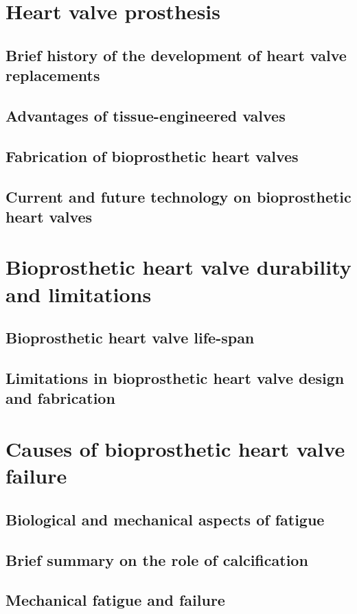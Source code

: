 \section{Heart valve prosthesis}

\subsection{Brief history of the development of heart valve replacements}

\subsection{Advantages of tissue-engineered valves}

\subsection{Fabrication of bioprosthetic heart valves}

\subsection{Current and future technology on bioprosthetic heart valves}




\section{Bioprosthetic heart valve durability and limitations}

\subsection{Bioprosthetic heart valve life-span}

\subsection{Limitations in bioprosthetic heart valve design and fabrication}


\section{Causes of bioprosthetic heart valve failure}

\subsection{Biological and mechanical aspects of fatigue}

\subsection{Brief summary on the role of calcification}

\subsection{Mechanical fatigue and failure}











